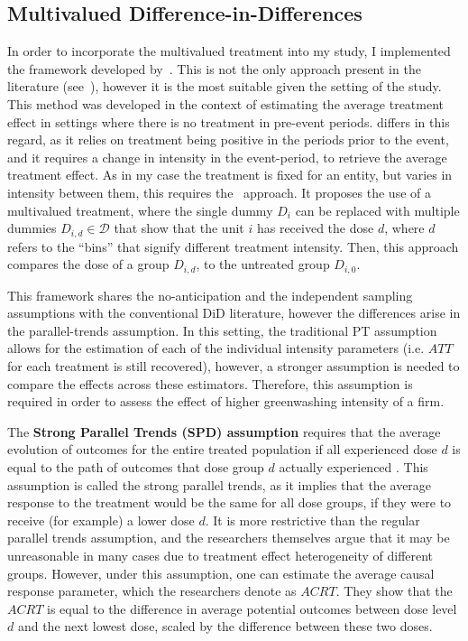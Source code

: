 \documentclass[12pt]{article}
\begin{document}
\subsection{Multivalued Difference-in-Differences}

In order to incorporate the multivalued treatment into my study, I implemented the framework developed by~\textcite{callawayDifferenceinDifferencesContinuousTreatment2025}. This is not the only approach present in the literature (see~\cite{dechaisemartinDifferenceinDifferenceEstimatorsContinuous2024}), however it is the most suitable given the setting of the study. This method was developed in the context of estimating the average treatment effect in settings where there is no treatment in pre-event periods.\@ \citeauthor{dechaisemartinDifferenceinDifferenceEstimatorsContinuous2024} differs in this regard, as it relies on treatment being positive in the periods prior to the event, and it requires a change in intensity in the event-period, to retrieve the average treatment effect. As in my case the treatment is fixed for an entity, but varies in intensity between them, this requires the~\textcite{callawayDifferenceinDifferencesContinuousTreatment2025} approach. It proposes the use of a multivalued treatment, where the single dummy $D_i$ can be replaced with multiple dummies $D_{i,d} \in \mathcal{D}$ that show that the unit $i$ has received the dose $d$, where $d$ refers to the ``bins'' that signify different treatment intensity. Then, this approach compares the dose of a group $D_{i,d}$, to the untreated group $D_{i,0}$.

This framework shares the no-anticipation and the independent sampling assumptions with the conventional DiD literature, however the differences arise in the parallel-trends assumption. In this setting, the traditional PT assumption allows for the estimation of each of the individual intensity parameters (i.e. $ATT$ for each treatment is still recovered), however, a stronger assumption is needed to compare the effects across these estimators. Therefore, this assumption is required in order to assess the effect of higher greenwashing intensity of a firm.  

The \textbf{Strong Parallel Trends (SPD) assumption} requires that the average evolution of  outcomes for the entire treated population if all experienced dose $d$ is equal to the path of outcomes that dose group $d$ actually experienced \parencite{callawayDifferenceinDifferencesContinuousTreatment2025}. This assumption is called the strong parallel trends, as it implies that the average response to the treatment would be the same for all dose groups, if they were to receive (for example) a lower dose $d$. It is more restrictive than the regular parallel trends assumption, and the researchers themselves argue that it may be unreasonable in many cases due to treatment effect heterogeneity of different groups. However, under this assumption, one can estimate the average causal response parameter, which the researchers denote as $ACRT$. They show that the $ACRT$ is equal to the difference in average potential outcomes between dose level $d$ and the next lowest dose, scaled by the difference between these two doses. 
\end{document}

